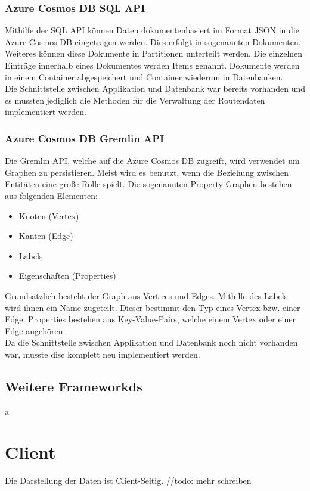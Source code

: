         \subsubsection{Azure Cosmos DB SQL API}
        Mithilfe der SQL API können Daten dokumentenbasiert im Format JSON in die Azure Cosmos DB 
        eingetragen werden. Dies erfolgt in sogenannten Dokumenten. Weiteres können diese Dokumente
        in Partitionen unterteilt werden. Die einzelnen Einträge innerhalb eines Dokumentes werden 
        Items genannt. Dokumente werden in einem Container abgespeichert und Container wiederum in Datenbanken.
        \\
        Die Schnittstelle zwischen Applikation und Datenbank war bereits vorhanden und es mussten jediglich
        die Methoden für die Verwaltung der Routendaten implementiert werden.

        \subsubsection{Azure Cosmos DB Gremlin API}
        Die Gremlin API, welche auf die Azure Cosmos DB zugreift, wird verwendet um Graphen zu persistieren.
        Meist wird es benutzt, wenn die Beziehung zwischen Entitäten eine große Rolle spielt. Die sogenannten
        Property-Graphen bestehen aus folgenden Elementen:
        \begin{itemize}
            \item Knoten (Vertex)
            \item Kanten (Edge)
            \item Labels
            \item Eigenschaften (Properties)
        \end{itemize}
        Grundsätzlich besteht der Graph aus Vertices und Edges. Mithilfe des Labels wird ihnen ein Name zugeteilt.
        Dieser bestimmt den Typ eines Vertex bzw. einer Edge. Properties bestehen aus Key-Value-Pairs, welche
        einem Vertex oder einer Edge angehören. 
        \\
        Da die Schnittstelle zwischen Applikation und Datenbank noch nicht vorhanden war, musste dise
        komplett neu implementiert werden.

    \subsection{Weitere Frameworkds}
    a

\section{Client}
Die Darstellung der Daten ist Client-Seitig. //todo: mehr schreiben


